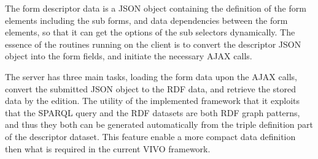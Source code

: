 
The form descriptor data is a JSON object containing the definition of the form elements including the sub forms, and data dependencies between the form elements, so that it can get the options of the sub selectors dynamically. The essence of the routines running on the client is to convert the descriptor JSON object into the form fields, and initiate the necessary AJAX calls.

The server has three main tasks, loading the form data upon the AJAX calls, convert the submitted JSON object to the RDF data, and retrieve the stored data by the edition. The utility of the implemented framework that it exploits that the SPARQL query and the RDF datasets are both RDF graph patterns, and thus they both can be generated automatically from the triple definition part of the descriptor dataset. This feature enable a more compact data definition then what is required in the current VIVO framework.

